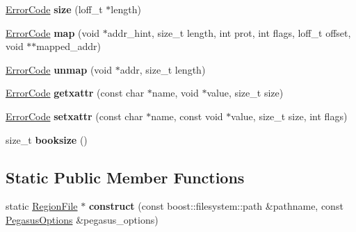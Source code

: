 \begin{DoxyCompactItemize}
\item 
\hyperlink{group__ERRORCODES_ga6263a3c9a0b8d36aea21cdd835ac99fe}{Error\+Code} {\bfseries size} (loff\+\_\+t $\ast$length)\hypertarget{classalps_1_1LfsRegionFile_a0e243bd2818afb0074c8b081ef832244}{}\label{classalps_1_1LfsRegionFile_a0e243bd2818afb0074c8b081ef832244}

\item 
\hyperlink{group__ERRORCODES_ga6263a3c9a0b8d36aea21cdd835ac99fe}{Error\+Code} {\bfseries map} (void $\ast$addr\+\_\+hint, size\+\_\+t length, int prot, int flags, loff\+\_\+t offset, void $\ast$$\ast$mapped\+\_\+addr)\hypertarget{classalps_1_1LfsRegionFile_a0422a2e6993d2f9514f8b9d3f8591393}{}\label{classalps_1_1LfsRegionFile_a0422a2e6993d2f9514f8b9d3f8591393}

\item 
\hyperlink{group__ERRORCODES_ga6263a3c9a0b8d36aea21cdd835ac99fe}{Error\+Code} {\bfseries unmap} (void $\ast$addr, size\+\_\+t length)\hypertarget{classalps_1_1LfsRegionFile_a45abfa040991646add32d5cfd032736a}{}\label{classalps_1_1LfsRegionFile_a45abfa040991646add32d5cfd032736a}

\item 
\hyperlink{group__ERRORCODES_ga6263a3c9a0b8d36aea21cdd835ac99fe}{Error\+Code} {\bfseries getxattr} (const char $\ast$name, void $\ast$value, size\+\_\+t size)\hypertarget{classalps_1_1LfsRegionFile_ae6fc356df22d6ec82d97e35019013bdc}{}\label{classalps_1_1LfsRegionFile_ae6fc356df22d6ec82d97e35019013bdc}

\item 
\hyperlink{group__ERRORCODES_ga6263a3c9a0b8d36aea21cdd835ac99fe}{Error\+Code} {\bfseries setxattr} (const char $\ast$name, const void $\ast$value, size\+\_\+t size, int flags)\hypertarget{classalps_1_1LfsRegionFile_ab3e7f8d216d341d4157444c2a5ae7625}{}\label{classalps_1_1LfsRegionFile_ab3e7f8d216d341d4157444c2a5ae7625}

\item 
size\+\_\+t {\bfseries booksize} ()\hypertarget{classalps_1_1LfsRegionFile_a526610896c98d23ddd9e29fbe20c04a6}{}\label{classalps_1_1LfsRegionFile_a526610896c98d23ddd9e29fbe20c04a6}

\end{DoxyCompactItemize}
\subsection*{Static Public Member Functions}
\begin{DoxyCompactItemize}
\item 
static \hyperlink{classalps_1_1RegionFile}{Region\+File} $\ast$ {\bfseries construct} (const boost\+::filesystem\+::path \&pathname, const \hyperlink{structalps_1_1PegasusOptions}{Pegasus\+Options} \&pegasus\+\_\+options)\hypertarget{classalps_1_1LfsRegionFile_a0137dec1c0ab38afd0d58c2433b20ab1}{}\label{classalps_1_1LfsRegionFile_a0137dec1c0ab38afd0d58c2433b20ab1}

\end{DoxyCompactItemize}
